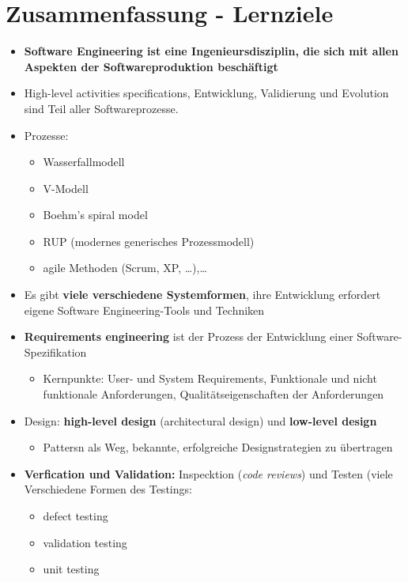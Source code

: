 \chapter{Zusammenfassung - Lernziele}
\begin{itemize}
    \item \textbf{Software Engineering ist eine Ingenieursdisziplin, die sich mit allen Aspekten der Softwareproduktion beschäftigt}
    \item High-level activities specifications, Entwicklung, Validierung und Evolution sind Teil aller Softwareprozesse.
    \item Prozesse:
    \begin{itemize}
        \item Wasserfallmodell
        \item V-Modell
        \item Boehm's spiral model
        \item RUP (modernes generisches Prozessmodell)
        \item agile Methoden (Scrum, XP, \dots),\dots
    \end{itemize}
    \item Es gibt \textbf{viele verschiedene Systemformen}, ihre Entwicklung erfordert eigene Software Engineering-Tools und Techniken 
    \item \textbf{Requirements engineering} ist der Prozess der Entwicklung einer Software-Spezifikation 
    \begin{itemize}
        \item Kernpunkte: User- und System Requirements, Funktionale und nicht funktionale Anforderungen, Qualitätseigenschaften der Anforderungen
    \end{itemize}
    \item Design: \textbf{high-level design} (architectural design) und \textbf{low-level design}
    \begin{itemize}
        \item Pattersn als Weg, bekannte, erfolgreiche Designstrategien zu übertragen
    \end{itemize}
    \item \textbf{Verfication und Validation:} Inspecktion (\textit{code reviews}) und Testen (viele Verschiedene Formen des Testings:
    \begin{itemize}
        \item defect testing
        \item validation testing
        \item unit testing

\end{itemize}
\end{itemize}
